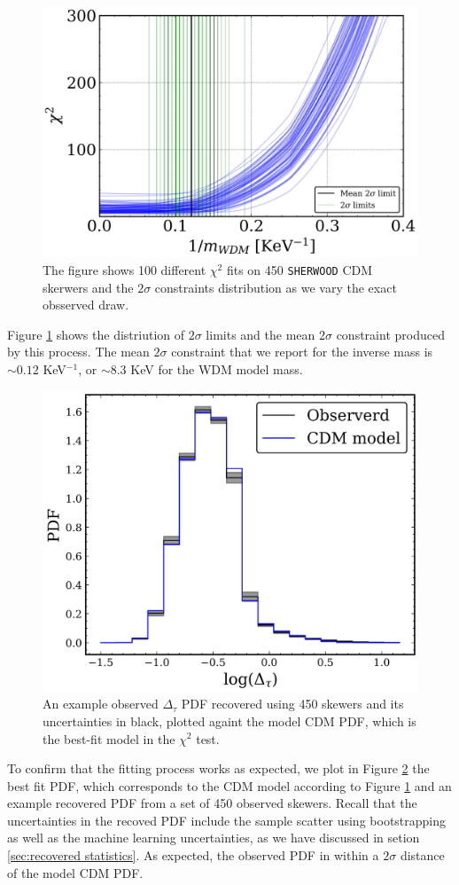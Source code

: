 \begin{figure}
    \centering
    \includegraphics[width=0.8\linewidth]{img/ML/inference_cdm_sherwood.png}
    \caption{The figure shows 100 different $\chi^2$ fits on 450 \texttt{SHERWOOD} CDM skerwers and the $2\sigma$ constraints distribution as we vary the exact obsserved draw.}
    \label{fig: inference cdm sherwood}
\end{figure}
Figure \ref{fig: inference cdm sherwood} shows the distriution of $2\sigma$ limits and the mean $2\sigma$ constraint produced by this process. The mean $2\sigma$ constraint that we report for the inverse mass is $\sim 0.12$ KeV$^{-1}$, or $\sim 8.3$ KeV for the WDM model mass.

\begin{figure}
    \centering
    \includegraphics[width=0.6\linewidth]{img/ML/pdf_model_observed.png}
    \caption{An example observed $\Delta_\tau$ PDF recovered using 450 skewers and its uncertainties in black, plotted againt the model CDM PDF, which is the best-fit model in the $\chi^2$ test. }
    \label{fig: inference cdm PDF}
\end{figure}

To confirm that the fitting process works as expected, we plot in Figure \ref{fig: inference cdm PDF} the best fit PDF, which corresponds to the CDM model according to Figure \ref{fig: inference cdm sherwood} and an example recovered PDF from a set of 450 observed skewers. Recall that the uncertainties in the recoved PDF include the sample scatter using bootstrapping as well as the machine learning uncertainties, as we have discussed in setion \ref{sec:recovered statistics}. As expected, the observed PDF in within a $2\sigma$ distance of the model CDM PDF.

